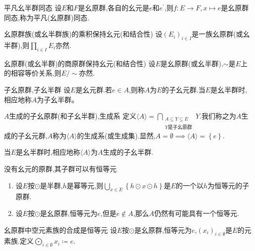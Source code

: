 \begin{definition}{平凡幺半群同态}{}
	设$E$和$F$是幺原群,各自的幺元是$e$和$e^{\prime}$,则$f:E\to F,x\mapsto e$是幺原群同态,称为平凡(幺原群)同态.
\end{definition}

\begin{proposition}{幺原群族(或幺半群族)的乘积保持幺元(和结合性)}{}
	设$\left(E_{i}\right)_{i\in I}$是一族幺原群(或幺半群),则$\prod\limits_{i\in I}E_{i}$亦然.
\end{proposition}

\begin{proposition}{幺原群(或幺半群)的商原群保持幺元(和结合性)}{}
	设$E$是幺原群(或幺半群),$\sim$是$E$上的相容等价关系,则$E/\sim$亦然.
\end{proposition}

\begin{definition}{子幺原群,子幺半群}{}
	设$E$是幺元群.若$e\in A$,则称$A$为$E$的子幺元群.当$E$是幺半群时,相应地称$A$为子幺半群。
\end{definition}

\begin{definition}{$A$生成的子幺原群(和子幺半群),生成系}{}
	定义$\langle A\rangle=\bigcap\limits_{\substack{A\subseteq Y\subseteq E\\Y\text{是子幺原群}}}Y$.我们称之为$A$生成的子幺元群,$A$称为$\langle A\rangle$的生成系(或生成集).显然,$A=\emptyset\implies\langle A\rangle=\left\{e\right\}$.
	
	当$E$是幺半群时,相应地称$\langle A\rangle$为$A$生成的子幺半群.
\end{definition}

\begin{example}{没有幺元的原群,其子群可以有恒等元}{}
	\begin{enumerate}
		\item 设$E$按$\odot$是半群,$h$是幂等元,则$\bigcup\limits_{x\in E}\left\{h\odot x\odot h\right\}$是$E$的一个以$h$为恒等元的子原群.
		\item 设$E$按$\odot$是幺原群,恒等元为$e$,但是$e\notin A$,那么$A$仍然有可能具有一个恒等元.
	\end{enumerate}
\end{example}

\begin{definition}{幺原群中空元素族的合成是恒等元}{}
	设$E$按$\odot$是幺原群,恒等元为$e$,$\left(x_{i}\right)_{i\in\emptyset}$是$E$的元素族.定义$\bigodot\limits_{i\in\emptyset}x_{i}\coloneq e$.
\end{definition}

